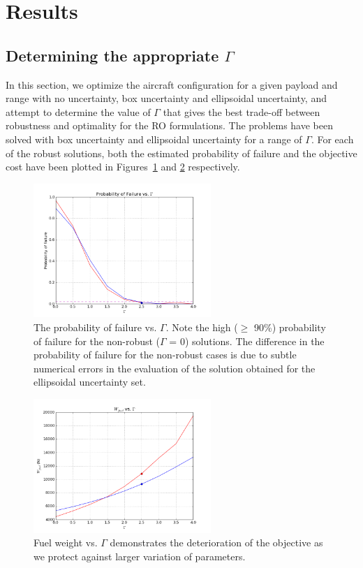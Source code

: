 \section{Results}

\subsection{Determining the appropriate $\Gamma$}

In this section, we optimize the aircraft configuration for a given payload and range with no uncertainty, box uncertainty and ellipsoidal uncertainty, and attempt to determine the value of $\Gamma$ that gives the best trade-off between robustness and optimality for the RO formulations. The problems have been solved with box uncertainty and ellipsoidal uncertainty for a range of $\Gamma$. For each of the robust solutions, both the estimated probability of failure and the objective cost have been plotted in Figures~\ref{fig:probOfFail_vs_Gamma} and \ref{fig:W_f_vs_Gamma} respectively.

\begin{figure}[h]
\centering
\includegraphics[width=0.6\textwidth]{probOfFail_vs_Gamma.png}
\caption{The probability of failure vs. $\Gamma$. Note the high ($\geq$ 90\%) probability of failure for the non-robust ($\Gamma$ = 0) solutions. The difference in the probability of failure for the non-robust cases is due to subtle numerical errors in the evaluation of the solution obtained for the ellipsoidal uncertainty set.}
\label{fig:probOfFail_vs_Gamma}
\end{figure}

\begin{figure}
\centering
\includegraphics[width=0.6\textwidth]{W_f_vs_Gamma.png}
\caption{Fuel weight vs. $\Gamma$ demonstrates the deterioration of the objective as we protect against larger variation of parameters.}
\label{fig:W_f_vs_Gamma}
\end{figure}

